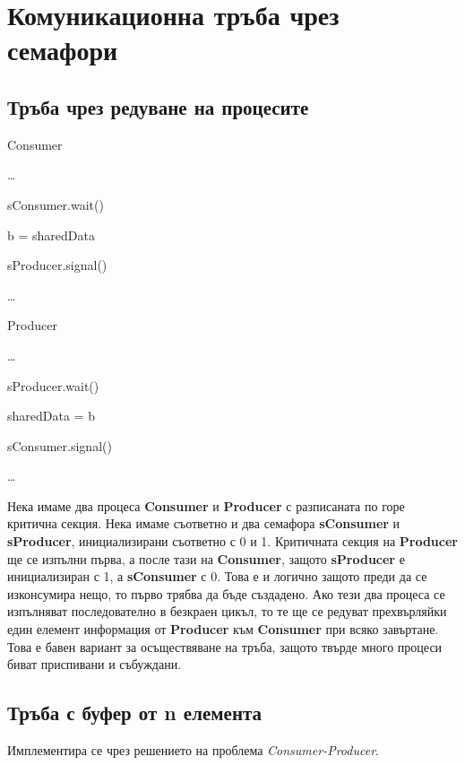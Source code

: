 \documentclass[fleqn,12pt]{article}
\begin{document}
\section{Комуникационна тръба чрез семафори}

\subsection{Тръба чрез редуване на процесите}
\begin{multicols}{2}
    Consumer

    \dots

    sConsumer.wait()
    
    b = sharedData
    
    sProducer.signal()
    
    \dots

\columnbreak
    Producer
    
    \dots
    
    sProducer.wait()
    
    sharedData = b
    
    sConsumer.signal()
    
    \dots

\end{multicols}

Нека имаме два процеса \textbf{Consumer} и \textbf{Producer} с разписаната по горе критична секция.
Нека имаме съответно и два семафора \textbf{sConsumer} и \textbf{sProducer}, инициализирани съответно с 0 и 1.
Критичната секция на \textbf{Producer} ще се изпълни първа, а после тази на \textbf{Consumer}, защото \textbf{sProducer} е инициализиран с 1, а \textbf{sConsumer} с 0.
Това е и логично защото преди да се изконсумира нещо, то първо трябва да бъде създадено.
Ако тези два процеса се изпълняват последователно в безкраен цикъл, то те ще се редуват прехвърляйки един елемент информация от \textbf{Producer} към \textbf{Consumer} при всяко завъртане.
Това е бавен вариант за осъществяване на тръба, защото твърде много процеси биват приспивани и събуждани.

\subsection{Тръба с буфер от n елемента}
    Имплементира се чрез решението на проблема \textit{Consumer-Producer}.
\end{document}
